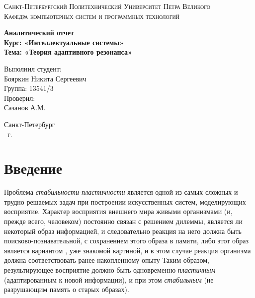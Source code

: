 \documentclass[14pt,a4paper,report]{article}
\begin{document}
\def\contentsname{Содержание}

\begin{titlepage}
	\begin{center}
		\textsc{Санкт-Петербургский Политехнический 
			Университет Петра Великого\\[5mm]
			Кафедра компьютерных систем и программных технологий}
		
		\vfill
		
		\textbf{Аналитический отчет\\[3mm]
			Курс: «Интеллектуальные системы»\\[6mm]
			Тема: «Теория адаптивного резонанса»\\[35mm]
		}
	\end{center}
	
	\hfill
	\begin{minipage}{.4\textwidth}
		Выполнил студент:\\[2mm] 
		Бояркин Никита Сергеевич\\
		Группа: 13541/3\\[5mm]
		
		Проверил:\\[2mm] 
		Сазанов А.М.
	\end{minipage}
	\vfill
	\begin{center}
		Санкт-Петербург\\ \the\year\ г.
	\end{center}
\end{titlepage}

\tableofcontents
\clearpage


\section{Введение}

Проблема \textit{стабильности-пластичности} является одной из самых сложных и трудно решаемых задач при построении искусственных систем, моделирующих восприятие. Характер восприятия внешнего мира живыми организмами (и, прежде всего, человеком) постоянно связан с решением дилеммы, является ли некоторый образ  информацией, и следовательно реакция на него должна быть поисково-познавательной, с сохранением этого образа в памяти, либо этот образ является вариантом , уже знакомой картиной, и в этом случае реакция организма должна соответствовать ранее накопленному опыту \cite{cite-lek-narod} Таким образом, результирующее восприятие должно быть одновременно \textit{пластичным} (адаптированным к новой информации), и при этом \textit{стабильным} (не разрушающим память о старых образах).
\end{document}
